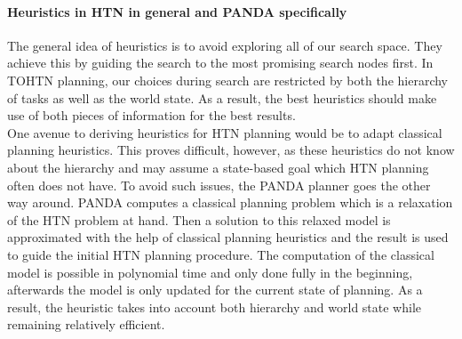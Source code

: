 \paragraph{Heuristics in HTN in general and PANDA specifically}
The general idea of heuristics is to avoid exploring all of our search space. They achieve this by guiding the search to the most promising search nodes first.
In TOHTN planning, our choices during search are restricted by both the hierarchy of tasks as well as the world state. As a result, the best heuristics should make use of both pieces of information for the best results. \\
One avenue to deriving heuristics for HTN planning would be to adapt classical planning heuristics. This proves difficult, however, as these heuristics do not know about the hierarchy and may assume a state-based goal which HTN planning often does not have. To avoid such issues, the PANDA planner goes the other way around. PANDA computes a classical planning problem which is a relaxation of the HTN problem at hand. Then a solution to this relaxed model is approximated with the help of classical planning heuristics and the result is used to guide the initial HTN planning procedure. The computation of the classical model is possible in polynomial time and only done fully in the beginning, afterwards the model is only updated for the current state of planning. As a result, the heuristic takes into account both hierarchy and world state while remaining relatively efficient.

